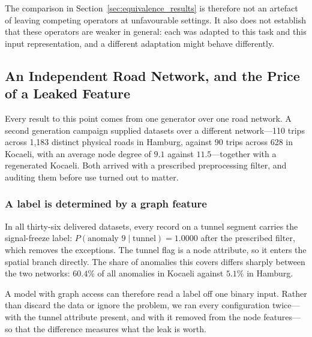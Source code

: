 \documentclass[journal]{IEEEtran}
\begin{document}
The comparison in Section~\ref{sec:equivalence_results} is therefore not an
artefact of leaving competing operators at unfavourable settings. It also does
not establish that these operators are weaker in general: each was adapted to
this task and this input representation, and a different adaptation might
behave differently.

\subsection{An Independent Road Network, and the Price of a Leaked Feature}
\label{sec:independent_network}
Every result to this point comes from one generator over one road network.
A second generation campaign supplied datasets over a different network---110
trips across 1{,}183 distinct physical roads in Hamburg, against 90 trips
across 628 in Kocaeli, with an average node degree of $9.1$ against
$11.5$---together with a regenerated Kocaeli. Both arrived with a prescribed
preprocessing filter, and auditing them before use turned out to matter.

\subsubsection{A label is determined by a graph feature}
\label{sec:tunnel_leak}
In all thirty-six delivered datasets, every record on a tunnel segment carries
the signal-freeze label: $P(\text{anomaly }9 \mid \text{tunnel}) = 1.0000$
after the prescribed filter, which removes the exceptions. The tunnel flag is
a node attribute, so it enters the spatial branch directly. The share of
anomalies this covers differs sharply between the two networks: $60.4\%$ of
all anomalies in Kocaeli against $5.1\%$ in Hamburg.

A model with graph access can therefore read a label off one binary input.
Rather than discard the data or ignore the problem, we ran every configuration
twice---with the tunnel attribute present, and with it removed from the node
features---so that the difference measures what the leak is worth.
\end{document}
